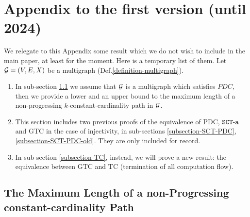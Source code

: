 \documentclass{lmcs}
\begin{document}



%
%
%
%
%



\newpage


\section{Appendix to the first version (until 2024)}
\label{section-appendix}

We relegate to this Appendix some result which 
we do not wish to include in the main paper, at least for the moment. 
Here is a temporary list of them. 
Let ${\mathcal G}=(V,E,X)$ be a multigraph (Def.\ref{definition-multigraph}).

\begin{enumerate}
\item
In sub-section \ref{subsection-constant-cardinality}
we assume that ${\mathcal G}$ is a multigraph which satisfies $PDC$, then
we provide a lower and an upper bound to the maximum length of a non-progressing 
$k$-constant-cardinality path in ${\mathcal G}$.


\item
This section includes two previous proofs of the equivalence of PDC, ${\tt SCT\mbox{-}a}$ and GTC 
in the case of injectivity, in sub-sections 
\ref{subsection-SCT-PDC}, \ref{subsection-SCT-PDC-old}. They are only included for record.

\item
In sub-section \ref{subsection-TC}, instead, we will prove a new result:
the equivalence between GTC and TC (termination of all computation flow).
\end{enumerate}



\subsection{The Maximum Length of a non-Progressing constant-cardinality Path}
\label{subsection-constant-cardinality}
\end{document}
